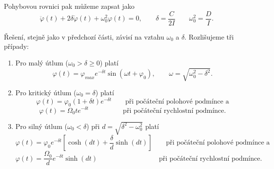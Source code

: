 \documentclass[english]{article}
\begin{document}
	Pohybovou rovnici pak můžeme zapsat jako
	\begin{equation}
	\ddot{\varphi}(t) + 2 \delta \dot{\varphi}(t) + \omega_0^2 \varphi(t) = 0, \qquad \delta = \frac{C}{2I} \qquad \omega_0^2 = \frac{D}{I}.
	\label{eq:pohl_I}
	\end{equation}

	Řešení, stejně jako v předchozí části, závisí na vztahu $\omega_0$ a $\delta$. Rozlišujeme tři případy:
	
	\begin{enumerate}
	\item Pro malý útlum ($\omega_0 > \delta \ge 0$) platí
	\begin{equation}
	\varphi(t) = \varphi_{max} e^{-\delta t} \sin (\omega t + \varphi_0), \qquad
	\omega = \sqrt{\omega_0^2 - \delta^2}.
	\end{equation}
	
	\item Pro kritický útlum ($\omega_0 = \delta$) platí
	\begin{equation}
	\varphi(t) = \varphi_0 (1 + \delta t) e^{-\delta t} \qquad 
	\textrm{při počáteční polohové podmínce a}
	\end{equation}
	\begin{equation}
	\varphi(t) = \Omega_0 t e^{-\delta t} \qquad\qquad\quad \textrm{při počáteční rychlostní podmínce.}
	\end{equation}
	
	\item Pro silný útlum ($\omega_0 < \delta$) při $d = \sqrt{\delta^2 - \omega_0^2}$ platí
	\begin{equation}
	\varphi(t) = \varphi_0 e^{-\delta t} \left[ \cosh(dt) + \frac{\delta}{d} \sinh (dt) \right] \qquad 
		\textrm{při počáteční polohové podmínce a}
	\end{equation}
	\begin{equation}
	\varphi(t) = \frac{\Omega_0}{d} e^{-\delta t} \sinh(dt) \qquad\qquad\qquad\qquad\quad \textrm{při počáteční rychlostní podmínce.}
	\end{equation}
	
	\end{enumerate}
	
\end{document}
